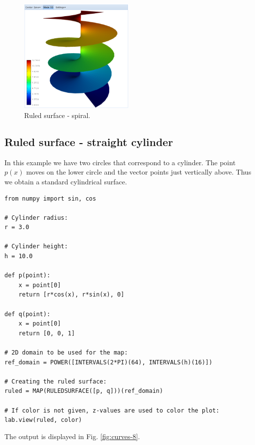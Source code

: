 \documentclass{article}
\begin{document}
\begin{figure}[!ht]
\begin{center}
\includegraphics[width=0.5\textwidth]{img/curves-7.png}
\end{center}
\vspace{-2mm}
\caption{Ruled surface - spiral.}
\label{fig:curves-7}
\end{figure}

\subsection{Ruled surface - straight cylinder}

In this example we have two circles that correspond to a cylinder.
The point $p(x)$ moves on the lower circle and the vector points 
just vertically above. Thus we obtain a standard cylindrical surface. 

\begin{verbatim}
from numpy import sin, cos

# Cylinder radius:
r = 3.0

# Cylinder height:
h = 10.0

def p(point):
    x = point[0]
    return [r*cos(x), r*sin(x), 0]
  
def q(point):
    x = point[0]
    return [0, 0, 1]

# 2D domain to be used for the map:  
ref_domain = POWER([INTERVALS(2*PI)(64), INTERVALS(h)(16)])

# Creating the ruled surface:
ruled = MAP(RULEDSURFACE([p, q]))(ref_domain)

# If color is not given, z-values are used to color the plot:
lab.view(ruled, color)
\end{verbatim}
The output is displayed in Fig. \ref{fig:curves-8}.

\newpage
\end{document}
